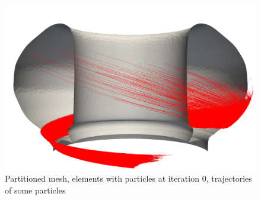 \documentclass[aspectratio=169]{beamer}
\begin{document}
\begin{frame}
\begin{figure}
    \includegraphics[height=.3\textheight]{gitrm_ptcl_movement.png}
    \caption*{Partitioned mesh, elements with particles at iteration 0, trajectories of some particles}
  \end{figure}
\end{frame}
\end{document}
